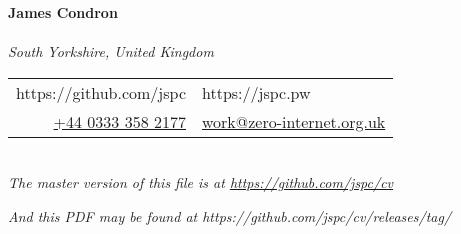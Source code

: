 \begin{center}
  {\huge\textbf{James Condron}}\\
  \textbf{\job} \\[\baselineskip]
  \textit{South Yorkshire, United Kingdom} \\

  \begin{tabular}{rl}
    https://github.com/jspc & https://jspc.pw \\
    \href{tel:+443333582177}{+44 0333 358 2177} & \href{mailto:work@zero-internet.org.uk}{work@zero-internet.org.uk}
  \end{tabular} \\[\baselineskip]

  {\footnotesize\textit{The master version of this file is at \url{https://github.com/jspc/cv}}}

  {\footnotesize\textit{And this PDF may be found at https://github.com/jspc/cv/releases/tag/}}%
  {}

\end{center}
